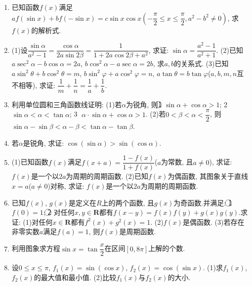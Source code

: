 \documentclass[10pt,a4paper]{article}
\begin{document}
\begin{enumerate}[1.]
\item 已知函数$f(x)$满足$af(\sin x)+bf(-\sin x)=c\sin x\cos x(-\dfrac{\pi }2\le x\le \dfrac{\pi }2,a^2-b^2\ne 0)$, 求$f(x)$的解析式.
\item (1)设$\dfrac{\sin \alpha}{a^2-1}=\dfrac{\cos \alpha }{2a\sin 2\beta }=\dfrac 1{1+2a\cos 2\beta +a^2}$, 求证: $\sin \alpha =\dfrac{a^2-1}{a^2+1}$.
(2)已知$a\sec ^2\alpha -b\cos \alpha =2a$, $b\cos ^2\alpha -a\sec \alpha =2b$, 求$a,b$的关系式.
(3)已知$a\sin ^2\theta +b\cos ^2\theta =m$, $b\sin ^2\varphi +a\cos ^2\varphi =n$, $a\tan \theta =b\tan \varphi$($a,b,m,n$互不相等), 求证: $\dfrac 1m+\dfrac 1n=\dfrac 1a+\dfrac 1b$.
\item 利用单位圆和三角函数线证明:
(1)若$\alpha$为锐角, 则\textcircled{1} $\sin \alpha +\cos \alpha >1$; \textcircled{2} $\sin \alpha <\alpha <\tan \alpha$; \textcircled{3} $\alpha \cdot \sin \alpha +\cos \alpha >1$.
(2)若$0<\beta <\alpha <\dfrac{\pi }2$, 则$\sin \alpha -\sin \beta <\alpha -\beta <\tan \alpha -\tan \beta$.
\item 若$\alpha$是锐角, 求证: $\cos (\sin \alpha)>\sin (\cos \alpha)$.
\item (1)已知函数$f(x)$满足$f(x+a)=\dfrac{1-f(x)}{1+f(x)}$($a$为常数, 且$a\ne 0$), 求证: $f(x)$是一个以$2a$为周期的周期函数.
(2)已知$f(x)$为偶函数, 其图象关于直线$x=a$($a\ne 0$)对称, 求证: $f(x)$是一个以$2a$为周期的周期函数.
\item 已知$f(x)$, $g(x)$是定义在$R$上的两个函数, 且$g(x)$为奇函数.并满足: \textcircled{1} $f(0)=1$; \textcircled{2} 对任何$x,y\in \mathbf{R}$都有$f(x-y)=f(x)f(y)+g(x)g(y)$.求证:
(1)对任何$x\in \mathbf{R}$都有$f^2(x)+g^2(x)=1$.
(2)$f(x)$是偶函数.
(3)若存在非零实数$a$满足$f(a)=1$, 则$f(x)$是周期函数.
\item 利用图象求方程$\sin x=\tan \dfrac x2$在区间$[0,8\pi]$上解的个数.
\item 设$0\le x\le \pi$, $f_1(x)=\sin (\cos x)$, $f_2(x)=\cos (\sin x)$.
(1)求$f_1(x)$, $f_2(x)$的最大值和最小值.
(2)比较$f_1(x)$与$f_2(x)$的大小.
    
\end{enumerate}
\end{document}

